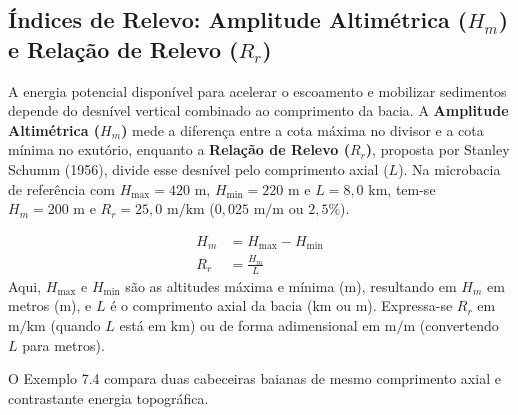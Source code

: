 \subsection{Índices de Relevo: Amplitude Altimétrica ($H_m$) e Relação de Relevo ($R_r$)}

A energia potencial disponível para acelerar o escoamento e mobilizar sedimentos depende do desnível vertical combinado ao comprimento da bacia. A \textbf{Amplitude Altimétrica ($H_m$)} mede a diferença entre a cota máxima no divisor e a cota mínima no exutório, enquanto a \textbf{Relação de Relevo ($R_r$)}, proposta por Stanley Schumm (1956), divide esse desnível pelo comprimento axial ($L$). Na microbacia de referência com $H_{\max} = 420\text{ m}$, $H_{\min} = 220\text{ m}$ e $L = 8{,}0\text{ km}$, tem-se $H_m = 200\text{ m}$ e $R_r = 25{,}0\text{ m}/\text{km}$ ($0{,}025\text{ m}/\text{m}$ ou $2{,}5\%$).

\begin{boxFormula}
\begin{align*}
  H_m &= H_{\max} - H_{\min} \\[4pt]
  R_r &= \frac{H_m}{L}
\end{align*}
Aqui, $H_{\max}$ e $H_{\min}$ são as altitudes máxima e mínima ($\text{m}$), resultando em $H_m$ em metros ($\text{m}$), e $L$ é o comprimento axial da bacia ($\text{km}$ ou $\text{m}$). Expressa-se $R_r$ em $\text{m}/\text{km}$ (quando $L$ está em $\text{km}$) ou de forma adimensional em $\text{m}/\text{m}$ (convertendo $L$ para metros).
\end{boxFormula}

O Exemplo 7.4 compara duas cabeceiras baianas de mesmo comprimento axial e contrastante energia topográfica.

